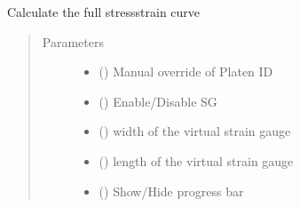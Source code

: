 \documentclass[letterpaper,10pt,english]{sphinxmanual}
\begin{document}
\begin{fulllineitems}
\begin{fulllineitems}
\begin{quote}
\begin{description}
\end{description}\end{quote}

\end{fulllineitems}


\begin{fulllineitems}
\label{\detokenize{openfdem:openfdem.openfdem.Model.complete_stress_strain}}
Calculate the full stress\sphinxhyphen{}strain curve
\begin{quote}\begin{description}
\item[{Parameters}] \leavevmode\begin{itemize}
\item {} 
 () \textendash{} Manual override of Platen ID

\item {} 
 () \textendash{} Enable/Disable SG

\item {} 
 () \textendash{} width of the virtual strain gauge

\item {} 
 () \textendash{} length of the virtual strain gauge

\item {} 
 () \textendash{} Show/Hide progress bar


\end{itemize}
\end{description}
\end{quote}
\end{fulllineitems}
\end{fulllineitems}
\end{document}
